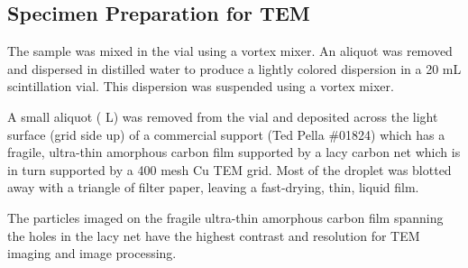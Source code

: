 \subsection{Specimen Preparation for TEM}

The sample was mixed in the vial using a vortex mixer. An
aliquot was removed and dispersed in distilled water to
produce a lightly colored dispersion in a 20 mL scintillation
vial. This dispersion was suspended using a vortex mixer.

A small aliquot ( \textmu L) was removed from the vial and
deposited across the light surface (grid side up) of a commercial
support (Ted Pella \#01824) which has a fragile, ultra-thin amorphous carbon
film supported by a lacy carbon net which is in turn supported by
a 400 mesh Cu TEM grid. Most of the droplet was blotted away with a
triangle of filter paper, leaving a fast-drying, thin, liquid film.

The particles imaged on the fragile ultra-thin amorphous carbon
film spanning the holes in the lacy net have the highest contrast
and resolution for TEM imaging and image processing.

\endinput
